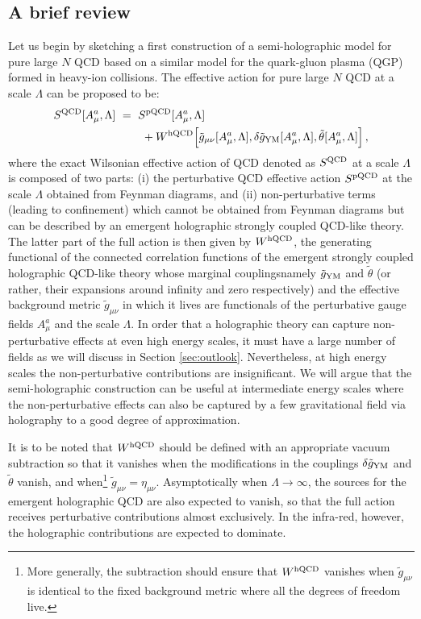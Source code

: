 \documentclass[prd,reprint,a4paper,showpacs,superscriptaddress,11pt,onecolumn,nofootinbib]{revtex4-1}
\renewcommand{\(}{\left(}
\renewcommand{\)}{\right)}
\newcommand{\6}{\partial}
\begin{document}
\subsection{A brief review}\label{review}
Let us begin by sketching a first construction of a semi-holographic model for pure large $N$ QCD based on a similar model \cite{Iancu:2014ava,Mukhopadhyay:2015smb,Mukhopadhyay:2016fkl} for the quark-gluon plasma (QGP) formed in heavy-ion collisions. The effective action for pure large $N$ QCD at a scale $\Lambda$ can be proposed to be:
\begin{align}\label{semi-hol-action}
S^{\rm QCD}[A_\mu^a, \Lambda] ~ &= ~ S^{\rm pQCD}[A_\mu^a, \Lambda] \nonumber \\
&\qquad + W^{\rm hQCD}\Big[\tilde{g}_{\mu\nu}[A_\mu^a, \Lambda], \delta\tilde{g}_{\rm YM}[A_\mu^a, \Lambda], \tilde{\theta}[A_\mu^a, \Lambda]\Big] \, ,
\end{align}
where the exact Wilsonian effective action of QCD denoted as $S^{\rm QCD}$ at a scale $\Lambda$ is composed of two parts: (i) the perturbative QCD effective action $S^{\rm pQCD}$ at the scale $\Lambda$ obtained from Feynman diagrams, and (ii) non-perturbative terms (leading to confinement) which cannot be obtained from Feynman diagrams but can be described by an emergent holographic strongly coupled QCD-like theory. The latter part of the full action is then given by $W^{\rm hQCD}$, the generating functional of the connected correlation functions of the emergent strongly coupled holographic QCD-like theory whose marginal couplings\textemdash namely $\tilde{g}_{\rm YM}$ and $\tilde{\theta}$ (or rather, their expansions around infinity and zero respectively) and the effective background metric $\tilde{g}_{\mu\nu}$ in which it lives are functionals of the perturbative gauge fields $A_\mu^a$ and the scale $\Lambda$. In order that a holographic theory can capture non-perturbative effects at even high energy scales, it must have a large number of fields as we will discuss in Section \ref{sec:outlook}. Nevertheless, at high energy scales the non-perturbative contributions are insignificant. We will argue that the semi-holographic construction can be useful at intermediate energy scales where the non-perturbative effects can also be captured by a few gravitational field via holography to a good degree of approximation.

It is to be noted that $W^{\rm hQCD}$ should be defined with an appropriate vacuum subtraction so that it vanishes when the modifications in the couplings $\delta\tilde{g}_{\rm YM}$ and $\tilde{\theta}$ vanish, and when\footnote{More generally, the subtraction should ensure that $W^{\rm hQCD}$ vanishes when $\tilde{g}_{\mu\nu}$ is identical to the fixed background metric where all the degrees of freedom live.} $\tilde{g}_{\mu\nu} = \eta_{\mu\nu}$. Asymptotically when $\Lambda \rightarrow \infty$, the sources for the emergent holographic QCD are also expected to vanish, so that the full action receives perturbative contributions almost exclusively. In the infra-red, however, the holographic contributions are expected to dominate. 
\end{document}
